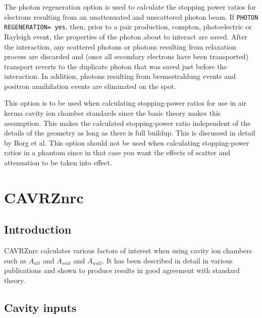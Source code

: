 \documentclass[12pt,twoside]{article}  %
\newcommand{\note}[1]{\mbox{}\\ \noindent \rule{16cm}{0.5mm} \\
{\em #1} \\ \noindent \rule{16cm}{0.5mm}\\
\typeout{******note: #1 *****}
}
\begin{document}
The photon regeneration option is used to calculate the stopping power ratios
for electrons resulting from an unattenuated and unscattered photon beam.
If {\tt PHOTON REGENERATION= yes}, then, prior to a pair production,
compton, photoelectric or Rayleigh event, the properties of the photon about
to interact are saved.  After the interaction, any scattered photons or
photons resulting from relaxation process are discarded and (once all 
secondary electrons have been transported) transport reverts to the duplicate
photon that was saved just before the interaction.  In addition, photons
resulting from bremsstrahlung events and positron annihilation events are
eliminated on the spot. 

This option is to be used when calculating stopping-power ratios for use
in air kerma cavity ion chamber standards since the basic theory makes this
assumption. This makes the calculated stopping-power ratio independent of
the details of the geometry as long as there is full buildup.  This is
discussed in detail by Borg et al\cite{Bo99a}.  This option should not be
used when calculating stopping-power ratios in a phantom since in that case
you want the effects of scatter and attenuation to be taken into effect.

 
\section{CAVRZnrc}
\renewcommand{\leftmark}{{CAVRZnrc}}

\subsection{Introduction}

CAVRZnrc calculates various factors of interest when using cavity ion
chambers such as $A_{att}$ and $A_{scat}$ and $A_{wall}$.  
It has been described in detail in various
publications\cite{Bi85,Ro85a,RB90a,Bi90a} and shown to produce results in
good agreement with standard theory\cite{Bo99a}.

\subsection{Cavity inputs}
\end{document}

